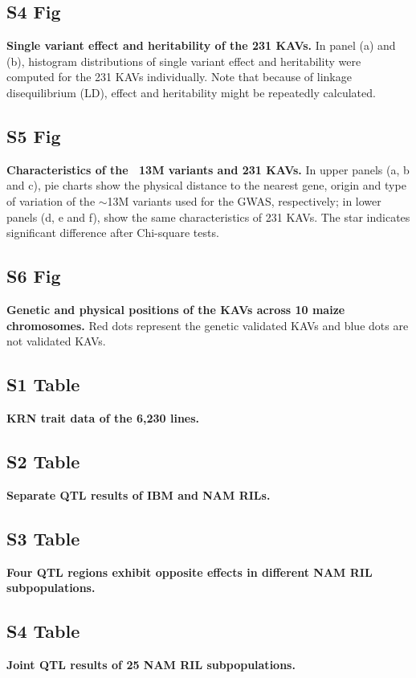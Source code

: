 \documentclass[10pt,letterpaper]{article}
\begin{document}
\subsection*{S4 Fig}
\label{Fig_S4}
{\bf Single variant effect and heritability of the 231 KAVs.} In panel (a) and (b), histogram distributions of single variant effect and heritability were computed for the 231 KAVs individually. Note that because of linkage disequilibrium (LD), effect and heritability might be repeatedly calculated.

\subsection*{S5 Fig}
\label{Fig_S5}
{\bf Characteristics of the ~13M variants and 231 KAVs. } In upper panels (a, b and c), pie charts show the physical distance to the nearest gene, origin and type of variation of the $\sim$13M variants used for the GWAS, respectively; in lower panels (d, e and f), show the same characteristics of 231 KAVs. The star indicates significant difference after Chi-square tests.

\subsection*{S6 Fig}
\label{Fig_S6}
{\bf Genetic and physical positions of the KAVs across 10 maize chromosomes.} Red dots represent the genetic validated KAVs and blue dots are not validated KAVs.

\subsection*{S1 Table}
\label{Table_S1}
{\bf KRN trait data of the 6,230 lines.}

\subsection*{S2 Table}
\label{Table_S2}
{\bf Separate QTL results of IBM and NAM RILs.}

\subsection*{S3 Table}
\label{Table_S3}
{\bf Four QTL regions exhibit opposite effects in different NAM RIL subpopulations.}

\subsection*{S4 Table}
\label{Table_S4}
{\bf Joint QTL results of 25 NAM RIL subpopulations.}
\end{document}
